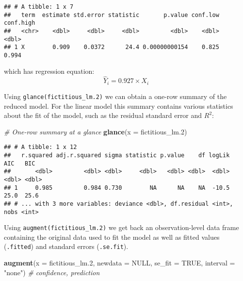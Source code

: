 \documentclass[
]{book}
\newenvironment{Shaded}{\begin{snugshade}}{\end{snugshade}}
\newcommand{\CommentTok}[1]{\textcolor[rgb]{0.56,0.35,0.01}{\textit{#1}}}
\newcommand{\DataTypeTok}[1]{\textcolor[rgb]{0.13,0.29,0.53}{#1}}
\newcommand{\FloatTok}[1]{\textcolor[rgb]{0.00,0.00,0.81}{#1}}
\newcommand{\KeywordTok}[1]{\textcolor[rgb]{0.13,0.29,0.53}{\textbf{#1}}}
\newcommand{\NormalTok}[1]{#1}
\newcommand{\OtherTok}[1]{\textcolor[rgb]{0.56,0.35,0.01}{#1}}
\newcommand{\StringTok}[1]{\textcolor[rgb]{0.31,0.60,0.02}{#1}}
\begin{document}
\begin{verbatim}
## # A tibble: 1 x 7
##   term  estimate std.error statistic       p.value conf.low conf.high
##   <chr>    <dbl>     <dbl>     <dbl>         <dbl>    <dbl>     <dbl>
## 1 X        0.909    0.0372      24.4 0.00000000154    0.825     0.994
\end{verbatim}

which has regression equation:
\[
\hat Y_i=0.927\times X_i
\]

Using \texttt{glance(fictitious\_lm.2)} we can obtain a one-row summary of the reduced model. For the linear model this summary contains various statistics about the fit of the model, such as the residual standard error and \(R^2\):

\begin{Shaded}
\begin{Highlighting}[]
\CommentTok{# One-row summary at a glance}
\KeywordTok{glance}\NormalTok{(}\DataTypeTok{x =}\NormalTok{ fictitious_lm}\FloatTok{.2}\NormalTok{)}
\end{Highlighting}
\end{Shaded}

\begin{verbatim}
## # A tibble: 1 x 12
##   r.squared adj.r.squared sigma statistic p.value    df logLik   AIC   BIC
##       <dbl>         <dbl> <dbl>     <dbl>   <dbl> <dbl>  <dbl> <dbl> <dbl>
## 1     0.985         0.984 0.730        NA      NA    NA  -10.5  25.0  25.6
## # ... with 3 more variables: deviance <dbl>, df.residual <int>, nobs <int>
\end{verbatim}

Using \texttt{augment(fictitious\_lm.2)} we get back an observation-level data frame containing the original data used to fit the model as well as fitted values (\texttt{.fitted}) and standard errors (\texttt{.se.fit}).

\begin{Shaded}
\begin{Highlighting}[]
\KeywordTok{augment}\NormalTok{(}\DataTypeTok{x =}\NormalTok{ fictitious_lm}\FloatTok{.2}\NormalTok{,}
        \DataTypeTok{newdata =} \OtherTok{NULL}\NormalTok{,}
        \DataTypeTok{se_fit =} \OtherTok{TRUE}\NormalTok{,}
        \DataTypeTok{interval =} \StringTok{"none"}\NormalTok{) }\CommentTok{# confidence, prediction}
\end{Highlighting}
\end{Shaded}
\end{document}
